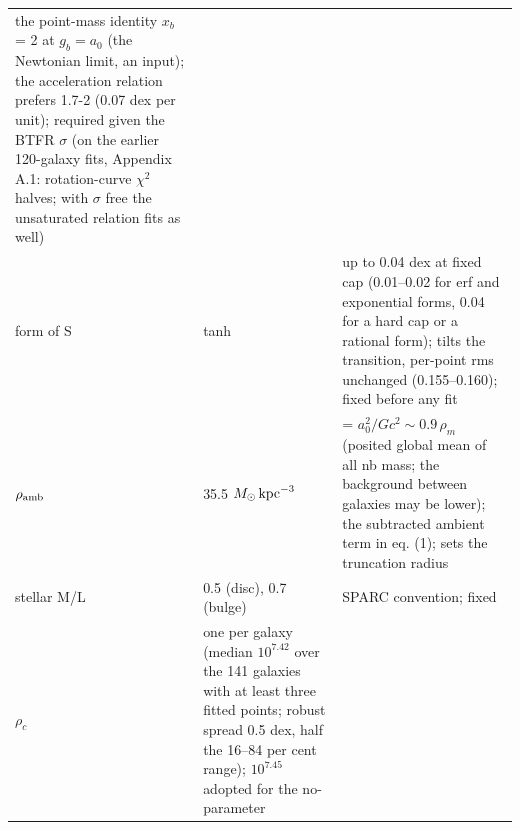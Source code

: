 \documentclass[
  10pt,
]{article}
\begin{document}
\begin{longtable}[]{@{}lll@{}}
\begin{minipage}[t]{0.50\columnwidth}
the point-mass identity $x_b$ = 2 at $g_b=a_0$ (the Newtonian limit, an input); the acceleration relation prefers 1.7-2 (0.07 dex per unit); required given the BTFR $\sigma$ (on the earlier 120-galaxy fits, Appendix A.1: rotation-curve $\chi^2$ halves; with $\sigma$ free the unsaturated relation fits as well)\strut
\end{minipage}\tabularnewline
\begin{minipage}[t]{0.24\columnwidth}\raggedright
form of S\strut
\end{minipage} & \begin{minipage}[t]{0.20\columnwidth}\raggedright
tanh\strut
\end{minipage} & \begin{minipage}[t]{0.50\columnwidth}\raggedright
up to 0.04 dex at fixed cap (0.01--0.02 for erf and exponential forms, 0.04 for a hard cap or a rational form); tilts the transition, per-point rms unchanged (0.155--0.160); fixed before any fit\strut
\end{minipage}\tabularnewline
\begin{minipage}[t]{0.24\columnwidth}\raggedright
$\rho_{\rm amb}$\strut
\end{minipage} & \begin{minipage}[t]{0.20\columnwidth}\raggedright
35.5 $M_\odot\,{\rm kpc}^{-3}$\strut
\end{minipage} & \begin{minipage}[t]{0.50\columnwidth}\raggedright
= $a_0^2/Gc^2\sim 0.9\,\rho_m$ (posited global mean of all nb mass; the background between galaxies may be lower); the subtracted ambient
term in eq. (1); sets the truncation radius\strut
\end{minipage}\tabularnewline
\begin{minipage}[t]{0.24\columnwidth}\raggedright
stellar M/L\strut
\end{minipage} & \begin{minipage}[t]{0.20\columnwidth}\raggedright
0.5 (disc), 0.7 (bulge)\strut
\end{minipage} & \begin{minipage}[t]{0.50\columnwidth}\raggedright
SPARC convention; fixed\strut
\end{minipage}\tabularnewline
\begin{minipage}[t]{0.24\columnwidth}\raggedright
$\rho_c$\strut
\end{minipage} & \begin{minipage}[t]{0.20\columnwidth}\raggedright
one per galaxy (median $10^{7.42}$ over the 141 galaxies with at least three fitted points; robust spread 0.5 dex, half the 16--84 per cent range); $10^{7.45}$ adopted for the no-parameter

\end{minipage}
\end{longtable}
\end{document}
